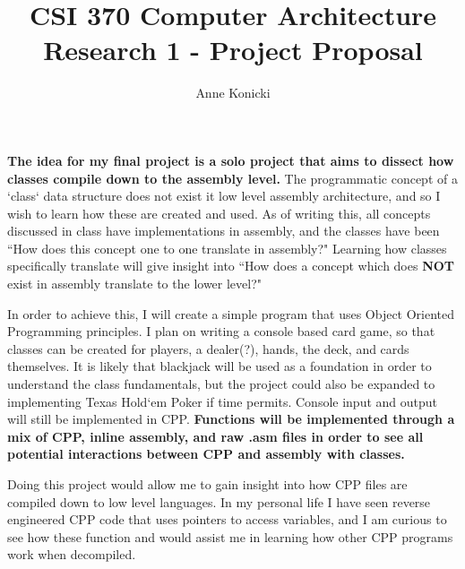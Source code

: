 \documentclass[twoside]{article}
\date{}
\begin{document}
    \title{CSI 370 Computer Architecture \\ Research 1 - Project Proposal}
    \author{Anne Konicki}
    \maketitle
    \renewcommand{\labelitemi}{$\diamond$}
    \noindent \textbf{The idea for my final project is a solo project that aims to dissect how classes compile down to the assembly level.}
    The programmatic concept of a `class` data structure does not exist it low level assembly architecture, and so I wish to learn how these are created and used.
    As of writing this, all concepts discussed in class have implementations in assembly, and the classes have been ``How does this concept one to one translate in assembly?"
    Learning how classes specifically translate will give insight into ``How does a concept which does \textbf{NOT} exist in assembly translate to the lower level?"

    In order to achieve this, I will create a simple program that uses Object Oriented Programming principles.
    I plan on writing a console based card game, so that classes can be created for players, a dealer(?), hands, the deck, and cards themselves.
    It is likely that blackjack will be used as a foundation in order to understand the class fundamentals, but the project could also be expanded to implementing Texas Hold`em Poker if time permits.
    Console input and output will still be implemented in CPP.
    \textbf{Functions will be implemented through a mix of CPP, inline assembly, and raw .asm files in order to see all potential interactions between CPP and assembly with classes.}

    Doing this project would allow me to gain insight into how CPP files are compiled down to low level languages.
    In my personal life I have seen reverse engineered CPP code that uses pointers to access variables, and I am curious to see how these function and would assist me in learning how other CPP programs work when decompiled.
\end{document}
